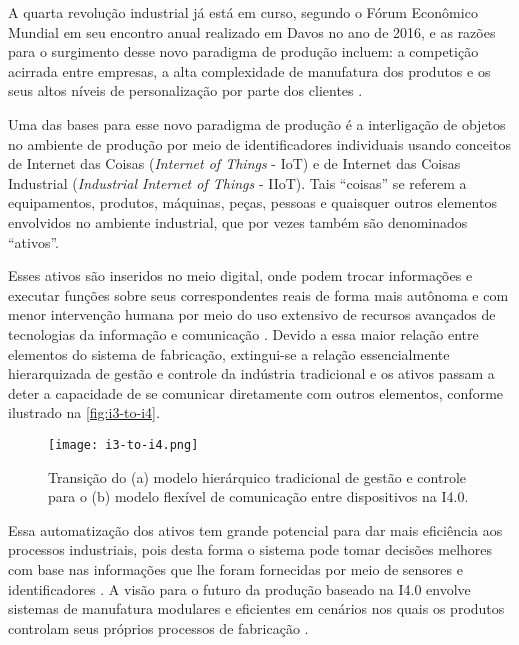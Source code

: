 A quarta revolução industrial já está em curso, segundo o Fórum Econômico Mundial \cite{schwab2016fourth} em seu encontro anual realizado em Davos no ano de 2016, e as razões para o surgimento desse novo paradigma de produção incluem: a competição acirrada entre empresas, a alta complexidade de manufatura dos produtos e os seus altos níveis de personalização por parte dos clientes \cite{bordeleau2018bi, vaidya2018industryfour}.

Uma das bases para esse novo paradigma de produção é a interligação de objetos no ambiente de produção por meio de identificadores individuais usando conceitos de Internet das Coisas (\textit{Internet of Things} - IoT) e de Internet das Coisas Industrial (\textit{Industrial Internet of Things} - IIoT). Tais ``coisas'' se referem a equipamentos, produtos, máquinas, peças, pessoas e quaisquer outros elementos envolvidos no ambiente industrial, que por vezes também são denominados ``ativos''.

Esses ativos são inseridos no meio digital, onde podem trocar informações e executar funções sobre seus correspondentes reais de forma mais autônoma e com menor intervenção humana por meio do uso extensivo de recursos avançados de tecnologias da informação e comunicação \cite{adolph2018roadmap}. Devido a essa maior relação entre elementos do sistema de fabricação, extingui-se a relação essencialmente hierarquizada de gestão e controle da indústria tradicional e os ativos passam a deter a capacidade de se comunicar diretamente com outros elementos, conforme ilustrado na \autoref{fig:i3-to-i4}.

\begin{figure}[t]
	\centering
	\texttt{[image: i3-to-i4.png]}
	\caption{Transição do (a) modelo hierárquico tradicional de gestão e controle para o (b) modelo flexível de comunicação entre dispositivos na I4.0.}
	\label{fig:i3-to-i4}
\end{figure}

Essa automatização dos ativos tem grande potencial para dar mais eficiência aos processos industriais, pois desta forma o sistema pode tomar decisões melhores com base nas informações que lhe foram fornecidas por meio de sensores e identificadores \cite{schmittner2017mtom}. A visão para o futuro da produção baseado na I4.0 envolve sistemas de manufatura modulares e eficientes em cenários nos quais os produtos controlam seus próprios processos de fabricação \cite{lasi2014industryfour}.

